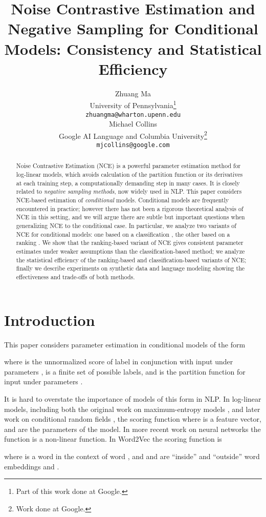 \documentclass[11pt,a4paper]{article}
\title{Noise Contrastive Estimation and Negative Sampling
for Conditional Models: Consistency and Statistical Efficiency}
\author{Zhuang Ma \\
  University of Pennsylvania\thanks{Part of this work done at Google.}\\
  {\tt zhuangma@wharton.upenn.edu} \\\And
  Michael Collins \\
  Google AI Language and Columbia University\thanks{Work done at Google.} \\
  {\tt mjcollins@google.com} \\}
\date{}
\begin{document}
\maketitle
\begin{abstract}
Noise Contrastive Estimation (NCE) is a powerful parameter estimation
method for log-linear models, which avoids calculation of the
partition function or its derivatives at each training step, a
computationally demanding step in many cases. It is closely related
to {\em negative sampling methods}, now widely used in NLP.
This paper considers
NCE-based estimation of {\em conditional} models. Conditional models
are frequently encountered in practice; however there has not been a
rigorous theoretical analysis of NCE in this setting, and we will
argue there are subtle but important questions when generalizing NCE
to the conditional case. In particular, we analyze two variants of NCE
for conditional models: one based on a classification , the other
based on a ranking . We show that the ranking-based variant of NCE
gives consistent parameter estimates under weaker assumptions than the
classification-based method; we analyze the statistical efficiency of
the ranking-based and classification-based variants of NCE; finally we
describe experiments on synthetic data and language modeling showing the effectiveness
and trade-offs of both methods.
\end{abstract}

\newcommand{\sss}{s}


\section{Introduction}
This paper considers parameter estimation in conditional models of
the form

where  is the unnormalized score of label  in
conjunction with input  under parameters ,  is
a finite set of possible labels, and  is the partition
function for input  under parameters .

It is hard to overstate the importance of models of this form in NLP.
In log-linear models, including both the original work on
maximum-entropy models \cite{maxent}, and later work on conditional
random fields \cite{crfs}, the scoring function  where  is a feature
vector, and  are the parameters of the model.  In
more recent work on neural networks the function 
is a non-linear function. In Word2Vec the
scoring function is

where  is a word in the context of word , and 
and  are ``inside'' and ``outside'' word embeddings 
 and .
\end{document}

